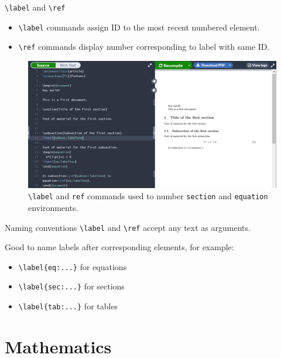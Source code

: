 \documentclass{beamer}
\begin{document}
{  \begin{frame}{\texttt{\textbackslash label} and \texttt{\textbackslash ref}}
    \begin{itemize}
      \item \texttt{\textbackslash label} commands assign ID to the most recent numbered element.
      \item \texttt{\textbackslash ref} commands display number corresponding to label with same ID.
    \end{itemize}
    \begin{figure}
      \includegraphics[width=0.9\linewidth]{day02-00A-references.png}
      \caption{\texttt{\textbackslash label} and \texttt{ref} commands used to number \texttt{section} and \texttt{equation} environments.}
      \label{fig:day02-00A}
    \end{figure}
  \end{frame}

  \begin{frame}{Naming conventions}
    \texttt{\textbackslash label} and \texttt{\textbackslash ref} accept any text as arguments.

    Good to name labels after corresponding elements, for example:
    \begin{itemize}
      \item \texttt{\textbackslash label\{eq:...\}} for equations
      \item \texttt{\textbackslash label\{sec:...\}} for sections
      \item \texttt{\textbackslash label\{tab:...\}} for tables
    \end{itemize}
  \end{frame}

  \section{Mathematics}

}
\end{document}
